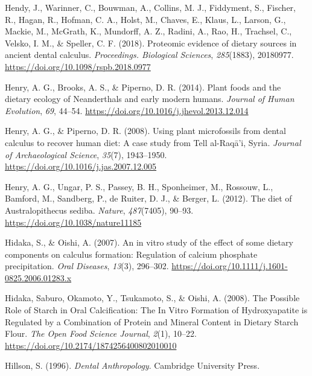 \documentclass[
  b5paper,
]{book}
\newlength{\cslhangindent}
\newlength{\cslentryspacingunit} %
\newenvironment{CSLReferences}[2] %
 {%
  \setlength{\parindent}{0pt}
  \ifodd #1
  \let\oldpar\par
  \def\par{\hangindent=\cslhangindent\oldpar}
  \fi
  \setlength{\parskip}{#2\cslentryspacingunit}
 }%
 {}
\begin{document}
\begin{CSLReferences}{1}{0}
\leavevmode{}%
Hendy, J., Warinner, C., Bouwman, A., Collins, M. J., Fiddyment, S.,
Fischer, R., Hagan, R., Hofman, C. A., Holst, M., Chaves, E., Klaus, L.,
Larson, G., Mackie, M., McGrath, K., Mundorff, A. Z., Radini, A., Rao,
H., Trachsel, C., Velsko, I. M., \& Speller, C. F. (2018). Proteomic
evidence of dietary sources in ancient dental calculus.
\emph{Proceedings. Biological Sciences}, \emph{285}(1883), 20180977.
\url{https://doi.org/10.1098/rspb.2018.0977}

\leavevmode{}%
Henry, A. G., Brooks, A. S., \& Piperno, D. R. (2014). Plant foods and
the dietary ecology of {Neanderthals} and early modern humans.
\emph{Journal of Human Evolution}, \emph{69}, 44--54.
\url{https://doi.org/10.1016/j.jhevol.2013.12.014}

\leavevmode{}%
Henry, A. G., \& Piperno, D. R. (2008). Using plant microfossils from
dental calculus to recover human diet: A case study from {Tell}
al-{Raq{ā}}'i, {Syria}. \emph{Journal of Archaeological Science},
\emph{35}(7), 1943--1950.
\url{https://doi.org/10.1016/j.jas.2007.12.005}

\leavevmode{}%
Henry, A. G., Ungar, P. S., Passey, B. H., Sponheimer, M., Rossouw, L.,
Bamford, M., Sandberg, P., de Ruiter, D. J., \& Berger, L. (2012). The
diet of {Australopithecus} sediba. \emph{Nature}, \emph{487}(7405),
90--93. \url{https://doi.org/10.1038/nature11185}

\leavevmode{}%
Hidaka, S., \& Oishi, A. (2007). An in vitro study of the effect of some
dietary components on calculus formation: Regulation of calcium
phosphate precipitation. \emph{Oral Diseases}, \emph{13}(3), 296--302.
\url{https://doi.org/10.1111/j.1601-0825.2006.01283.x}

\leavevmode{}%
Hidaka, Saburo, Okamoto, Y., Tsukamoto, S., \& Oishi, A. (2008). The
{Possible Role} of {Starch} in {Oral Calcification}: {The In Vitro
Formation} of {Hydroxyapatite} is {Regulated} by a {Combination} of
{Protein} and {Mineral Content} in {Dietary Starch Flour}. \emph{The
Open Food Science Journal}, \emph{2}(1), 10--22.
\url{https://doi.org/10.2174/1874256400802010010}

\leavevmode{}%
Hillson, S. (1996). \emph{Dental {Anthropology}}. {Cambridge University
Press}.


\end{CSLReferences}
\end{document}
